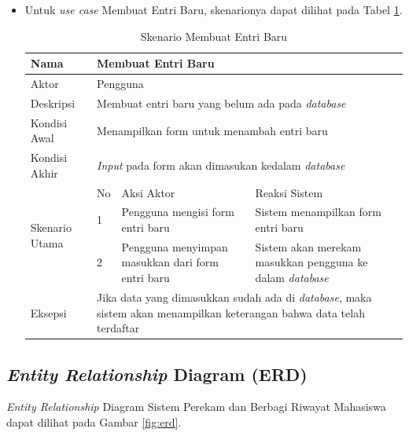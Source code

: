 \begin{itemize}
\item Untuk {\it use case} Membuat Entri Baru, skenarionya dapat dilihat pada Tabel
\ref{tab:skenarioentribaru}.

\begin{table}[ht]
\centering
\caption[Tabel Skenario Membuat Entri Baru]{Skenario Membuat Entri Baru}
\label{tab:skenarioentribaru}
\begin{tabular}{|p{1.4cm}|p{0.4cm}|p{2cm}|p{2cm}|p{2cm}|p{2cm}|}
\hline
Nama & \multicolumn{5}{p{8cm}|}{Membuat Entri Baru} \\ \hline
Aktor & \multicolumn{5}{p{8cm}|}{Pengguna} \\ \hline
Deskripsi & \multicolumn{5}{p{8cm}|}{Membuat entri baru yang belum ada pada
{\it database}} \\ \hline
Kondisi Awal & \multicolumn{5}{p{8cm}|}{Menampilkan form untuk menambah entri baru} \\ \hline
Kondisi Akhir & \multicolumn{5}{p{8cm}|}{{\it Input} pada form akan dimasukan kedalam {\it database}} \\ \hline
\multirow{3}{*}{\parbox{1.4cm}{Skenario Utama}} & No &
\multicolumn{2}{p{4cm}|}{Aksi Aktor} & \multicolumn{2}{p{4cm}|}{Reaksi Sistem}
\\ \cline{2-6}
& 1 & \multicolumn{2}{p{4cm}|}{Pengguna mengisi form entri baru} &
\multicolumn{2}{p{4cm}|}{Sistem menampilkan form entri baru} \\ \cline{2-6}
& 2 & \multicolumn{2}{p{4cm}|}{Pengguna menyimpan masukkan dari form entri baru}
& \multicolumn{2}{p{4cm}|}{Sistem akan merekam masukkan pengguna ke dalam
{\it database}} \\ \hline
Eksepsi & \multicolumn{5}{p{8cm}|}{Jika data yang dimasukkan sudah ada di {\it database}, maka sistem akan menampilkan keterangan bahwa data telah terdaftar} \\ \hline
\end{tabular}
\end{table}
\end{itemize}

\subsection{{\it Entity Relationship} Diagram (ERD)}
{\it Entity Relationship} Diagram Sistem Perekam dan Berbagi Riwayat Mahasiswa dapat
dilihat pada Gambar \ref{fig:erd}.

